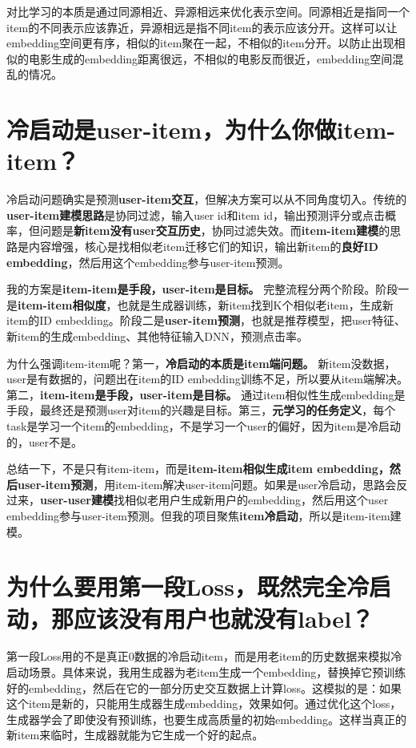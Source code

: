 \documentclass[UTF8]{ctexart}
\begin{document}
对比学习的本质是通过同源相近、异源相远来优化表示空间。同源相近是指同一个item的不同表示应该靠近，异源相远是指不同item的表示应该分开。这样可以让embedding空间更有序，相似的item聚在一起，不相似的item分开。以防止出现相似的电影生成的embedding距离很远，不相似的电影反而很近，embedding空间混乱的情况。

\section{冷启动是user-item，为什么你做item-item？}

冷启动问题确实是预测\textbf{user-item交互}，但解决方案可以从不同角度切入。传统的\textbf{user-item建模思路}是协同过滤，输入user id和item id，输出预测评分或点击概率，但问题是\textbf{新item没有user交互历史}，协同过滤失效。而\textbf{item-item建模}的思路是内容增强，核心是找相似老item迁移它们的知识，输出新item的\textbf{良好ID embedding}，然后用这个embedding参与user-item预测。

我的方案是\textbf{item-item是手段，user-item是目标。} 完整流程分两个阶段。阶段一是\textbf{item-item相似度}，也就是生成器训练，新item找到K个相似老item，生成新item的ID embedding。阶段二是\textbf{user-item预测}，也就是推荐模型，把user特征、新item的生成embedding、其他特征输入DNN，预测点击率。

为什么强调item-item呢？第一，\textbf{冷启动的本质是item端问题。} 新item没数据，user是有数据的，问题出在item的ID embedding训练不足，所以要从item端解决。第二，\textbf{item-item是手段，user-item是目标。} 通过item相似性生成embedding是手段，最终还是预测user对item的兴趣是目标。第三，\textbf{元学习的任务定义}，每个task是学习一个item的embedding，不是学习一个user的偏好，因为item是冷启动的，user不是。

总结一下，不是只有item-item，而是\textbf{item-item相似生成item embedding，然后user-item预测}，用item-item解决user-item问题。如果是user冷启动，思路会反过来，\textbf{user-user建模}找相似老用户生成新用户的embedding，然后用这个user embedding参与user-item预测。但我的项目聚焦\textbf{item冷启动}，所以是item-item建模。

\section{为什么要用第一段Loss，既然完全冷启动，那应该没有用户也就没有label？}

第一段Loss用的不是真正0数据的冷启动item，而是用老item的历史数据来模拟冷启动场景。具体来说，我用生成器为老item生成一个embedding，替换掉它预训练好的embedding，然后在它的一部分历史交互数据上计算loss。这模拟的是：如果这个item是新的，只能用生成器生成embedding，效果如何。通过优化这个loss，生成器学会了即使没有预训练，也要生成高质量的初始embedding。这样当真正的新item来临时，生成器就能为它生成一个好的起点。
\end{document}
